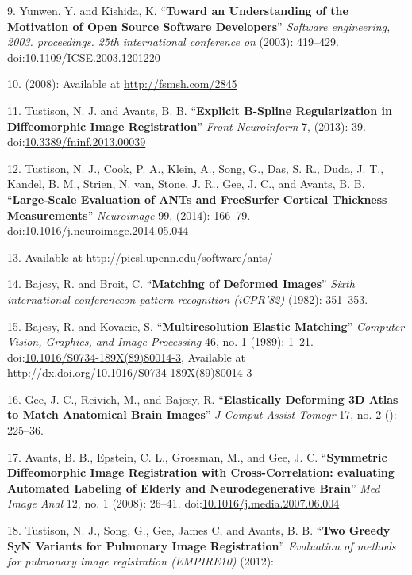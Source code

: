 \documentclass[11pt,]{article}
\begin{document}
9. Yunwen, Y. and Kishida, K. ``\textbf{Toward an Understanding of the
Motivation of Open Source Software Developers}'' \emph{Software
engineering, 2003. proceedings. 25th international conference on}
(2003): 419--429.
doi:\href{http://dx.doi.org/10.1109/ICSE.2003.1201220}{10.1109/ICSE.2003.1201220}

10. (2008): Available at \url{http://fsmsh.com/2845}

11. Tustison, N. J. and Avants, B. B. ``\textbf{Explicit B-Spline
Regularization in Diffeomorphic Image Registration}'' \emph{Front
Neuroinform} 7, (2013): 39.
doi:\href{http://dx.doi.org/10.3389/fninf.2013.00039}{10.3389/fninf.2013.00039}

12. Tustison, N. J., Cook, P. A., Klein, A., Song, G., Das, S. R., Duda,
J. T., Kandel, B. M., Strien, N. van, Stone, J. R., Gee, J. C., and
Avants, B. B. ``\textbf{Large-Scale Evaluation of ANTs and FreeSurfer
Cortical Thickness Measurements}'' \emph{Neuroimage} 99, (2014):
166--79.
doi:\href{http://dx.doi.org/10.1016/j.neuroimage.2014.05.044}{10.1016/j.neuroimage.2014.05.044}

13. Available at \url{http://picsl.upenn.edu/software/ants/}

14. Bajcsy, R. and Broit, C. ``\textbf{Matching of Deformed Images}''
\emph{Sixth international conferenceon pattern recognition (iCPR'82)}
(1982): 351--353.

15. Bajcsy, R. and Kovacic, S. ``\textbf{Multiresolution Elastic
Matching}'' \emph{Computer Vision, Graphics, and Image Processing} 46,
no. 1 (1989): 1--21.
doi:\href{http://dx.doi.org/10.1016/S0734-189X(89)80014-3}{10.1016/S0734-189X(89)80014-3},
Available at \url{http://dx.doi.org/10.1016/S0734-189X(89)80014-3}

16. Gee, J. C., Reivich, M., and Bajcsy, R. ``\textbf{Elastically
Deforming 3D Atlas to Match Anatomical Brain Images}'' \emph{J Comput
Assist Tomogr} 17, no. 2 (): 225--36.

17. Avants, B. B., Epstein, C. L., Grossman, M., and Gee, J. C.
``\textbf{Symmetric Diffeomorphic Image Registration with
Cross-Correlation: evaluating Automated Labeling of Elderly and
Neurodegenerative Brain}'' \emph{Med Image Anal} 12, no. 1 (2008):
26--41.
doi:\href{http://dx.doi.org/10.1016/j.media.2007.06.004}{10.1016/j.media.2007.06.004}

18. Tustison, N. J., Song, G., Gee, James C, and Avants, B. B.
``\textbf{Two Greedy SyN Variants for Pulmonary Image Registration}''
\emph{Evaluation of methods for pulmonary image registration (EMPIRE10)}
(2012):
\end{document}

